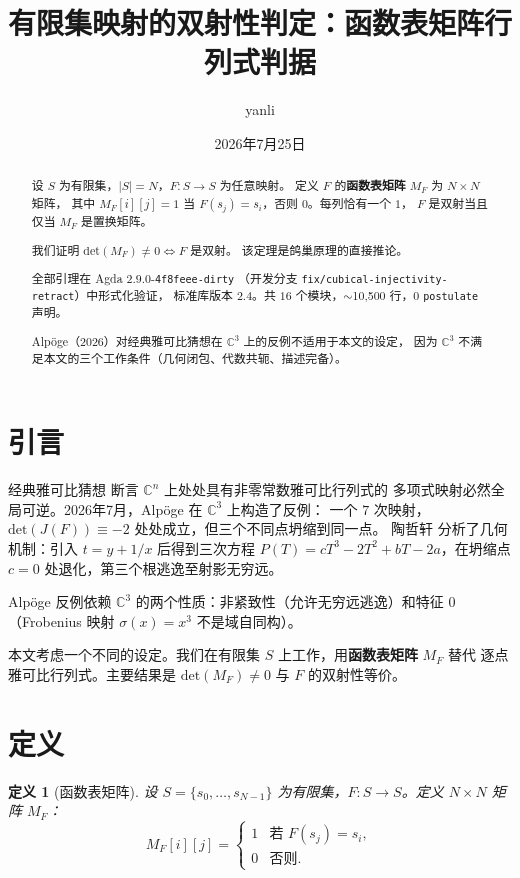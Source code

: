 \documentclass[a4paper,11pt]{article}
\title{有限集映射的双射性判定：函数表矩阵行列式判据}
\author{yanli}
\date{2026年7月25日}
\newtheorem{definition}[theorem]{定义}
\theoremstyle{remark}
\newcommand{\C}{\mathbb{C}}
\newcommand{\MF}{M_F}
\newcommand{\Det}{\mathrm{det}}
\newcommand{\Jac}{J(F)}
\newcommand{\Frob}{\sigma}
\begin{document}
\maketitle

\begin{abstract}
设 $S$ 为有限集，$|S|=N$，$F:S\to S$ 为任意映射。
定义 $F$ 的\textbf{函数表矩阵} $\MF$ 为 $N\times N$ 矩阵，
其中 $\MF[i][j]=1$ 当 $F(s_j)=s_i$，否则 $0$。每列恰有一个 $1$，
$F$ 是双射当且仅当 $\MF$ 是置换矩阵。

我们证明 $\Det(\MF)\neq 0 \iff F$ 是双射。
该定理是鸽巢原理的直接推论。

全部引理在 Agda $2.9.0$-\texttt{4f8feee-dirty}
（开发分支 \texttt{fix/cubical-injectivity-retract}）中形式化验证，
标准库版本 $2.4$。共 $16$ 个模块，$\sim$10,500 行，$0$ \texttt{postulate} 声明。

Alp\"{o}ge（2026）对经典雅可比猜想在 $\C^3$ 上的反例不适用于本文的设定，
因为 $\C^3$ 不满足本文的三个工作条件（几何闭包、代数共轭、描述完备）。
\end{abstract}

\section{引言}

经典雅可比猜想 \cite{keller} 断言 $\C^n$ 上处处具有非零常数雅可比行列式的
多项式映射必然全局可逆。2026年7月，Alp\"{o}ge \cite{alpoge} 在 $\C^3$ 上构造了反例：
一个 $7$ 次映射，$\Det(\Jac)\equiv-2$ 处处成立，但三个不同点坍缩到同一点。
陶哲轩 \cite{tao} 分析了几何机制：引入 $t=y+1/x$ 后得到三次方程
$P(T)=cT^3-2T^2+bT-2a$，在坍缩点 $c=0$ 处退化，第三个根逃逸至射影无穷远。

Alp\"{o}ge 反例依赖 $\C^3$ 的两个性质：非紧致性（允许无穷远逃逸）和特征 $0$
（Frobenius 映射 $\Frob(x)=x^3$ 不是域自同构）。

本文考虑一个不同的设定。我们在有限集 $S$ 上工作，用\textbf{函数表矩阵} $\MF$ 替代
逐点雅可比行列式。主要结果是 $\Det(\MF)\neq 0$ 与 $F$ 的双射性等价。

\section{定义}

\begin{definition}[函数表矩阵]
设 $S=\{s_0,\dots,s_{N-1}\}$ 为有限集，$F:S\to S$。定义 $N\times N$ 矩阵 $\MF$：
\[
\MF[i][j] = \begin{cases}
1 & \text{若 } F(s_j) = s_i,\\
0 & \text{否则}.
\end{cases}
\]
\end{definition}
\end{document}
